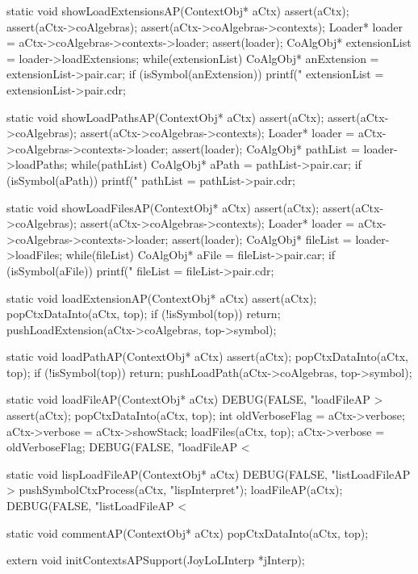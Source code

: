 \starttyping
static void showLoadExtensionsAP(ContextObj* aCtx) {
  assert(aCtx);
  assert(aCtx->coAlgebras);
  assert(aCtx->coAlgebras->contexts);
  Loader* loader = aCtx->coAlgebras->contexts->loader;
  assert(loader);
  CoAlgObj* extensionList = loader->loadExtensions;
  while(extensionList) {
    CoAlgObj* anExtension = extensionList->pair.car;
    if (isSymbol(anExtension)) printf("%
    extensionList = extensionList->pair.cdr;
  }
}

static void showLoadPathsAP(ContextObj* aCtx) {
  assert(aCtx);
  assert(aCtx->coAlgebras);
  assert(aCtx->coAlgebras->contexts);
  Loader* loader = aCtx->coAlgebras->contexts->loader;
  assert(loader);
  CoAlgObj* pathList = loader->loadPaths;
  while(pathList) {
    CoAlgObj* aPath = pathList->pair.car;
    if (isSymbol(aPath)) printf("%
    pathList = pathList->pair.cdr;
  }
}

static void showLoadFilesAP(ContextObj* aCtx) {
  assert(aCtx);
  assert(aCtx->coAlgebras);
  assert(aCtx->coAlgebras->contexts);
  Loader* loader = aCtx->coAlgebras->contexts->loader;
  assert(loader);
  CoAlgObj* fileList = loader->loadFiles;
  while(fileList) {
    CoAlgObj* aFile = fileList->pair.car;
    if (isSymbol(aFile)) printf("%
    fileList = fileList->pair.cdr;
  }
}

static void loadExtensionAP(ContextObj* aCtx) {
  assert(aCtx);
  popCtxDataInto(aCtx, top);
  if (!isSymbol(top)) return;
  pushLoadExtension(aCtx->coAlgebras, top->symbol);
}

static void loadPathAP(ContextObj* aCtx) {
  assert(aCtx);
  popCtxDataInto(aCtx, top);
  if (!isSymbol(top)) return;
  pushLoadPath(aCtx->coAlgebras, top->symbol);
}

static void loadFileAP(ContextObj* aCtx) {
  DEBUG(FALSE, "loadFileAP > %
  assert(aCtx);
  popCtxDataInto(aCtx, top);
  int oldVerboseFlag = aCtx->verbose;
  aCtx->verbose = aCtx->showStack;
  loadFiles(aCtx, top);
  aCtx->verbose = oldVerboseFlag;
  DEBUG(FALSE, "loadFileAP < %
}

static void lispLoadFileAP(ContextObj* aCtx) {
  DEBUG(FALSE, "listLoadFileAP > %
  pushSymbolCtxProcess(aCtx, "lispInterpret");
  loadFileAP(aCtx);
  DEBUG(FALSE, "listLoadFileAP < %
}
\stoptyping

\startCCode
static void commentAP(ContextObj* aCtx) {
  popCtxDataInto(aCtx, top);
}
\stopCCode

\startCHeader
extern void initContextsAPSupport(JoyLoLInterp *jInterp);
\stopCHeader

